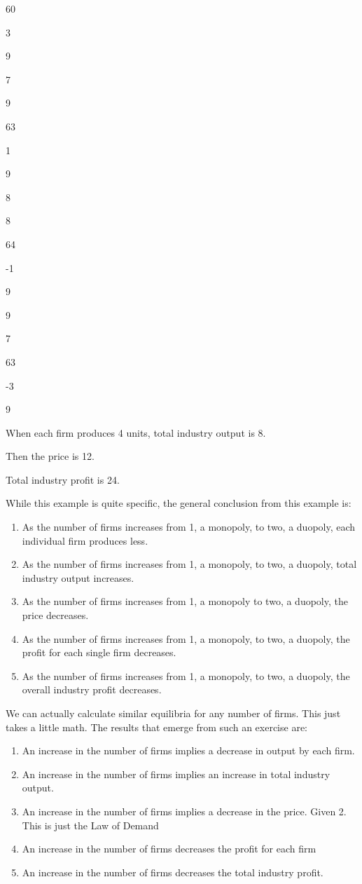 \documentclass[
]{book}
\providecommand{\tightlist}{%
  \setlength{\itemsep}{0pt}\setlength{\parskip}{0pt}}
\begin{document}
60

3

9

7

9

63

1

9

8

8

64

-1

9

9

7

63

-3

9

When each firm produces 4 units, total industry output is 8.

Then the price is 12.

Total industry profit is 24.

While this example is quite specific, the general conclusion from this example is:

\begin{enumerate}
\def\labelenumi{\arabic{enumi}.}
\tightlist
\item
  As the number of firms increases from 1, a monopoly, to two, a duopoly, each individual firm produces less.
\item
  As the number of firms increases from 1, a monopoly, to two, a duopoly, total industry output increases.\\
\item
  As the number of firms increases from 1, a monopoly to two, a duopoly, the price decreases.
\item
  As the number of firms increases from 1, a monopoly, to two, a duopoly, the profit for each single firm decreases.
\item
  As the number of firms increases from 1, a monopoly, to two, a duopoly, the overall industry profit decreases.
\end{enumerate}

We can actually calculate similar equilibria for any number of firms. This just takes a little math. The results that emerge from such an exercise are:

\begin{enumerate}
\def\labelenumi{\arabic{enumi}.}
\tightlist
\item
  An increase in the number of firms implies a decrease in output by each firm.
\item
  An increase in the number of firms implies an increase in total industry output.
\item
  An increase in the number of firms implies a decrease in the price. Given 2. This is just the Law of Demand
\item
  An increase in the number of firms decreases the profit for each firm
\item
  An increase in the number of firms decreases the total industry profit.
\end{enumerate}
\end{document}
